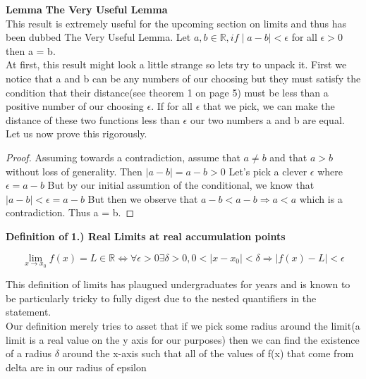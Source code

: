 \documentclass[12pt]{article}
\theoremstyle{definition}
\newenvironment{lemma}{\vspace{1em}\noindent\textbf{Lemma}}{\vspace{1em}}
\newenvironment{definition}{\vspace{1em}\noindent\textbf{Definition of}}{\vspace{1em}}
\begin{document}
\begin{lemma}
\textbf{The Very Useful Lemma}\\
This result is extremely useful for the upcoming section on limits and thus has been dubbed The Very Useful Lemma.
Let $a,b \in \mathbb{R}, if \mid a - b\mid < \epsilon$ for all $\epsilon > 0$ then a = b.\\
At first, this result might look a little strange so lets try to unpack it. First we notice that a and b can be any numbers of our choosing but they must satisfy the condition that their distance(see theorem 1 on page 5) must be less than a positive number of our choosing $\epsilon$. If for all $\epsilon$ that we pick, we can make the distance of these two functions less than $\epsilon$ our two numbers a and b are equal.\\
Let us now prove this rigorously.

\begin{proof}
  Assuming towards a contradiction, assume that $a \ne b$ and that $a > b$
  without loss of generality. Then $\mid a - b \mid = a - b > 0$
  Let's pick a clever $\epsilon$ where $\epsilon = a - b$ But by our initial assumtion of the conditional, we know that $\mid a - b \mid < \epsilon = a - b$
  But then we observe that $a - b < a - b \Rightarrow a < a$ which is a contradiction. Thus a = b.

\end{proof}

\end{lemma}


\begin{definition}
  \textbf{1.) Real Limits at real accumulation points}

  \[ \lim_{x\to x_0} f(x) = L \in \mathbb{R} \iff \forall \epsilon > 0 \exists \delta > 0, 0<\mid x - x_0 \mid < \delta \Rightarrow \mid f(x) - L \mid < \epsilon \]	
 
This definition of limits has plaugued undergraduates for years and is known to be particularly tricky to fully digest due to the nested quantifiers in the statement. \\
Our definition merely tries to asset that if we pick some radius around the limit(a limit is a real value on the y axis for our purposes) then we can find the existence of a radius $\delta$ around the x-axis such that all of the values of f(x) that come from delta are in our radius of epsilon
\end{definition}
\end{document}
